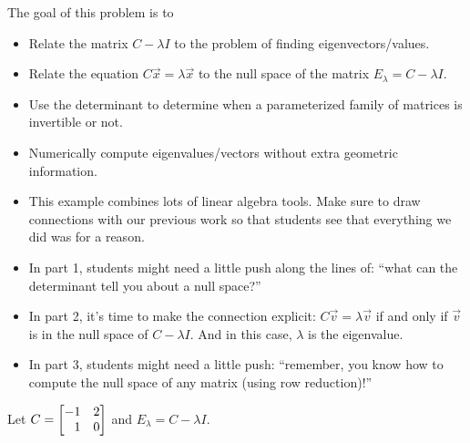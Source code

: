 \documentclass{problemset}
\newcommand{\bookonlynewpage}{\begin{bookonly}\newpage\end{bookonly}}
\begin{document}
	\bookonlynewpage
	\question
	\begin{annotation}
		\begin{goals}

			The goal of this problem is to
			\begin{itemize}
				\item Relate the matrix $C-\lambda I$ to the problem of finding eigenvectors/values.
				\item Relate the equation $C\vec x=\lambda \vec x$ to the null
					space of the matrix $E_{\lambda} = C-\lambda I$.
				\item Use the determinant to determine when a parameterized family of matrices
					is invertible or not.
				\item Numerically compute eigenvalues/vectors without extra geometric information.
			\end{itemize}
		\end{goals}

		\begin{notes}
			\begin{itemize}
				\item This example combines lots of linear algebra tools. Make sure to draw
					connections with our previous work so that students see that
					everything we did was for a reason.
				\item In part 1, students might need a little push along the lines of:
					``what can the determinant tell you about a null space?''
				\item In part 2, it's time to make the connection explicit: $C\vec v=\lambda \vec v$
					if and only if $\vec v$ is in the null space of $C-\lambda I$. And in this case,
					$\lambda$ is the eigenvalue.
				\item In part 3, students might need a little push: ``remember, you know how
					to compute the null space of any matrix (using row reduction)!''
			\end{itemize}
		\end{notes}
	\end{annotation}
	Let $C=\mat{-1&2\\1&0}$ and $E_\lambda = C-\lambda I$.
\end{document}
